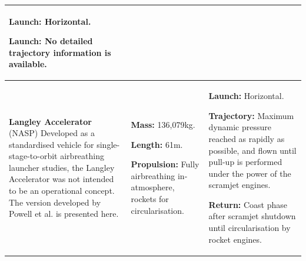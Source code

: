 {\begin{landscape}
\begin{xltabular}{\linewidth}{|X|X|X|}
			\textbf{Launch:} Horizontal.
			
			\textbf{Launch:} No detailed trajectory information is available.
			\\
			\hline\small \textbf{Langley Accelerator} (NASP)\cite{WCC,Powell1991,Lu1993} 
			\newline  \newline Developed as a standardised vehicle for single-stage-to-orbit airbreathing launcher studies, the Langley Accelerator was not intended to be an operational concept. The version developed by Powell et al.\cite{Powell1991} is presented here. 
			&
			\small
			
			\textbf{Mass:} 136,079kg.
			
			\textbf{Length:}  61m.
			
			\textbf{Propulsion:} Fully airbreathing in-atmosphere, rockets for circularisation.
			
			&
			\small
			
			\textbf{Launch:} Horizontal. 
			
			\textbf{Trajectory:} Maximum dynamic pressure reached as rapidly as possible, and flown until pull-up is performed under the power of the scramjet engines. 
			
			\textbf{Return:} Coast phase after scramjet shutdown until circularisation by rocket engines.
			

\end{xltabular}
\end{landscape}}
